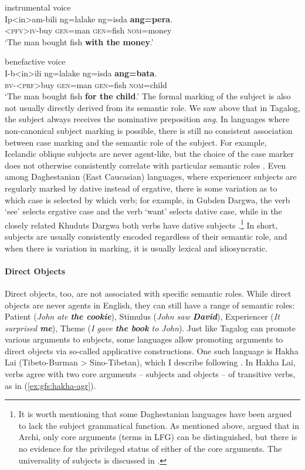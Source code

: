 \documentclass[output=paper]{../langscibook}
\begin{document}
    \ex instrumental voice\\
    \gll Ip<in>am-bili ng=lalake ng=isda \textbf{ang=pera}.\\
    <\textsc{pfv}>\textsc{iv}-buy \textsc{gen}=man \textsc{gen}=fish \textsc{nom}=money\\
    \glt `The man bought fish \textbf{with the money}.'
    
    \ex benefactive voice\\
    \gll I-b<in>ili ng=lalake ng=isda \textbf{ang=bata}.\\
    \textsc{bv-<prf>}buy \textsc{gen}=man \textsc{gen}=fish \textsc{nom}=child\\
    \glt `The man bought fish \textbf{for the child}.'
    \z
 \z
   The formal marking of the subject is also not usually directly derived from its semantic role. We saw above that in Tagalog, the subject always receives the nominative preposition \textit{ang}. In languages where non-canonical subject marking is possible, there is still no consistent association between case marking and the semantic role of the subject. For example, Icelandic oblique subjects are never agent-like, but the choice of the case marker does not otherwise consistently correlate with particular semantic roles \citep{jonsson03}. Even among Daghestanian (East Caucasian) languages, where experiencer subjects are regularly marked by dative instead of ergative, there is some variation as to which case is selected by which verb; for example, in Gubden Dargwa, the verb `see' selects ergative case and the verb `want' selects dative case, while in the closely related Khuduts Dargwa both verbs have dative subjects \citep[246]{ganenkov2013}.\footnote{It is worth mentioning that some Daghestanian languages have been argued to lack the subject grammatical function. As mentioned above, \citet{kibrik2000} argued that in Archi, only core arguments (terms in LFG) can be distinguished, but there is no evidence for the privileged status of either of the core arguments. The universality of subjects is discussed in .} In short, subjects are usually consistently encoded regardless of their semantic role, and when there is variation in marking, it is usually lexical and idiosyncratic.
  
 \paragraph{Direct Objects} 
  
Direct objects, too, are not associated with specific semantic roles. While direct objects are never agents in English, they can still have a range of semantic roles: Patient (\textit{John ate \textbf{the cookie}}), Stimulus (\textit{John saw \textbf{David}}), Experiencer (\textit{It surprised \textbf{me}}), Theme (\textit{I gave \textbf{the book} to John}). Just like Tagalog can promote various arguments to subjects, some languages allow promoting arguments to direct objects via so-called applicative constructions. One such language is Hakha Lai (Tibeto-Burman > Sino-Tibetan), which I describe following \citet[15ff.]{peterson2007}. In Hakha Lai, verbs agree with two core arguments -- subjects and objects -- of transitive verbs, as in (\ref{ex:gfs:hakha-agr}).
 
\end{document}
